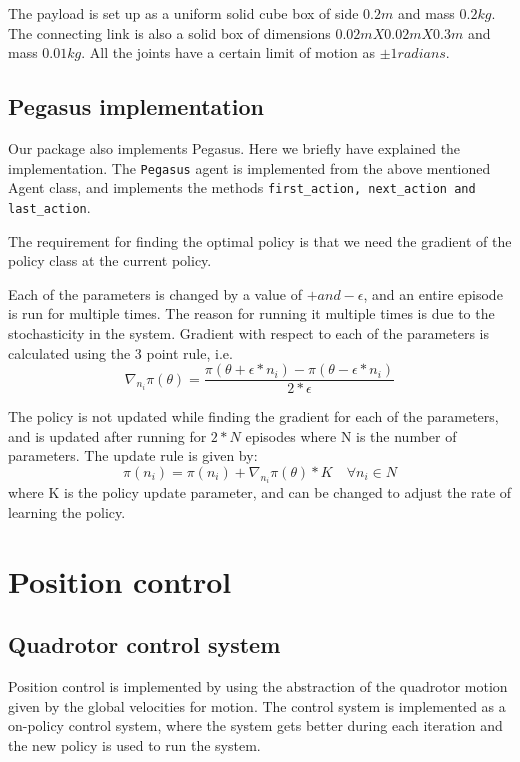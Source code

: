 \documentclass[hidelinks,BTech]{iitmdiss}
\begin{document}
The payload is set up as a uniform solid cube box of side $0.2m$ and mass $0.2kg$. The connecting link is also a solid box of dimensions $0.02m X 0.02m X 0.3m$ and mass $0.01kg$. All the joints have a certain limit of motion as $\pm 1 radians$.

\section{Pegasus implementation}
Our package also implements Pegasus. Here we briefly have explained the implementation. The \texttt{Pegasus} agent is implemented from the above mentioned Agent class, and implements the methods \texttt{first\_action, next\_action and last\_action}.

The requirement for finding the optimal policy is that we need the gradient of the policy class at the current policy. 

Each of the parameters is changed by a value of $+ and -\epsilon$, and an entire episode is run for multiple times. The reason for running it multiple times is due to the stochasticity in the system. Gradient with respect to each of the parameters is calculated using the 3 point rule, i.e.
\begin{equation}
\nabla_{n_i} \pi(\theta) =  \dfrac {\pi(\theta+\epsilon*n_i)-\pi(\theta-\epsilon*n_i)}  {2 * \epsilon}
\end{equation}

The policy is not updated while finding the gradient for each of the parameters, and is updated after running for $2*N$ episodes where N is the number of parameters. The update rule is given by: 
\begin{equation}
\pi(n_i) = \pi(n_i) + \nabla_{n_i} \pi(\theta) * K \quad \forall n_i \in N
\end{equation}
where K is the policy update parameter, and can be changed to adjust the rate of learning the policy.

\chapter{Position control}

\section{Quadrotor control system}
Position control is implemented by using the abstraction of the quadrotor motion given by the global velocities for motion. The control system is implemented as a on-policy control system, where the system gets better during each iteration and the new policy is used to run the system.
\end{document}
